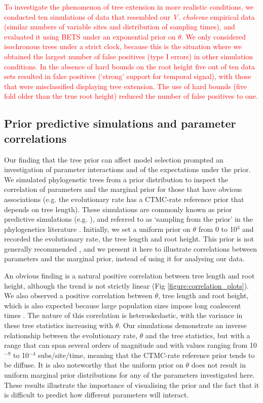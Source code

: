 \documentclass[10pt,letterpaper]{article}
\begin{document}
\textcolor{red}{To investigate the phenomenon of tree extension in more realistic conditions, we conducted ten simulations of data that resembled our \textit{V. cholerae} empirical data (similar numbers of variable sites and distribution of sampling times), and evaluated it using BETS under an exponential prior on $\theta$. We only considered isochronous trees under a strict clock, because this is the situation where we obtained the largest number of false positives (type I errors) in other simulation conditions. In the absence of hard bounds on the root height five out of ten data sets resulted in false positives (`strong' support for temporal signal), with those that were misclassified displaying tree extension. The use of hard bounds (five fold older than the true root height) reduced the number of false positives to one.} 

\subsection*{Prior predictive simulations and parameter correlations}
Our finding that the tree prior can affect model selection prompted an investigation of parameter interactions and of the expectations under the prior. We simulated phylogenetic trees from a prior distribution to inspect the correlation of parameters and the marginal prior for those that have obvious associations (e.g. the evolutionary rate has a CTMC-rate reference prior that depends on tree length). These simulations are commonly known as prior predictive simulations (e.g. \cite{wesner2021choosing}), and referred to as `sampling from the prior' in the phylogenetics literature \cite{nascimento2017biologist}. Initially, we set a uniform prior on $\theta$ from 0 to 10$^3$ and recorded the evolutionary rate, the tree length and root height. This prior is not generally recommended \cite{bouckaertDating}, and we present it here to illustrate correlations between parameters and the marginal prior, instead of using it for analysing our data.

An obvious finding is a natural positive correlation between tree length and root height, although the trend is not strictly linear (Fig \ref{figure:correlation_plots}). We also observed a positive correlation between $\theta$, tree length and root height, which is also expected because large population sizes impose long coalescent times \cite{rosenberg2002genealogical}. The nature of this correlation is heteroskedastic, with the variance in these tree statistics increasing with $\theta$. Our simulations demonstrate an inverse relationship between the evolutionary rate, $\theta$ and the tree statistics, but with a range that can span several orders of magnitude and with values ranging from 10$^{-9}$ to 10$^{-4}$ subs/site/time, meaning that the CTMC-rate reference prior tends to be diffuse. It is also noteworthy that the uniform prior on $\theta$ does not result in uniform marginal prior distributions for any of the parameters investigated here. These results illustrate the importance of visualising the prior and the fact that it is difficult to predict how different parameters will interact.
\end{document}
